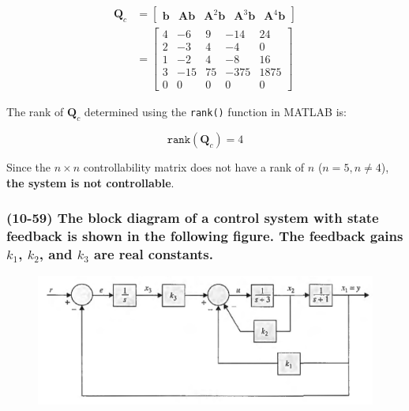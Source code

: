 \documentclass[12pt, letterpaper]{../assignment}
\begin{document}
\begin{equation*}
\begin{aligned} 
\textbf{Q}_c &= \left[\begin{array}{ccccc}
    \textbf{b} & \textbf{A}\textbf{b} & \textbf{A}^2\textbf{b} & \textbf{A}^3\textbf{b} & \textbf{A}^4\textbf{b} \end{array}\right]\\
             &= \left[\begin{array}{rrrrr}
                 4 &  -6 &  9 &  -14 &   24 \\
                 2 &  -3 &  4 &   -4 &    0 \\
                 1 &  -2 &  4 &   -8 &   16 \\
                 3 & -15 & 75 & -375 & 1875 \\
                 0 &   0 &  0 &    0 &    0
                \end{array}\right]
\end{aligned}   
\end{equation*}

The rank of $\textbf{Q}_c$ determined using the \texttt{rank()} function in MATLAB is:

$$ \texttt{rank}(\textbf{Q}_c ) = 4 $$

\begin{answer}
Since the $n \times n$ controllability matrix does not have a rank of $n$ ($n=5,n \neq 4$),
\textbf{the system is not controllable}.
\end{answer}

\subsubsection*{(10-59)
The block diagram of a control system with state feedback is shown in the following figure.
The feedback gains $k_1$, $k_2$, and $k_3$ are real constants.}

\begin{figure}[H]
    \centering
    \includegraphics[width=\linewidth]{./figures/P10_59.png}
 \end{figure}
\end{document}
